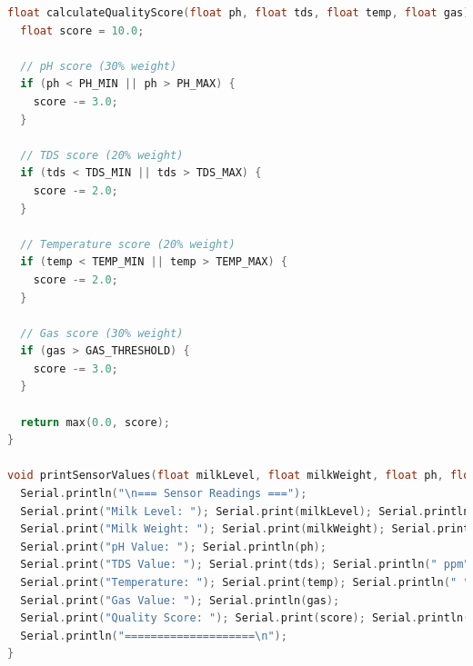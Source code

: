\documentclass[12pt,a4paper]{article}
\begin{document}
\begin{lstlisting}[language=C++, basicstyle=\ttfamily\small, breaklines=true, frame=single, caption={Full Arduino Code for Milk Monitoring System}]
float calculateQualityScore(float ph, float tds, float temp, float gas) {
  float score = 10.0;
  
  // pH score (30% weight)
  if (ph < PH_MIN || ph > PH_MAX) {
    score -= 3.0;
  }
  
  // TDS score (20% weight)
  if (tds < TDS_MIN || tds > TDS_MAX) {
    score -= 2.0;
  }
  
  // Temperature score (20% weight)
  if (temp < TEMP_MIN || temp > TEMP_MAX) {
    score -= 2.0;
  }
  
  // Gas score (30% weight)
  if (gas > GAS_THRESHOLD) {
    score -= 3.0;
  }
  
  return max(0.0, score);
}

void printSensorValues(float milkLevel, float milkWeight, float ph, float tds, float temp, float gas, float score) {
  Serial.println("\n=== Sensor Readings ===");
  Serial.print("Milk Level: "); Serial.print(milkLevel); Serial.println(" cm");
  Serial.print("Milk Weight: "); Serial.print(milkWeight); Serial.println(" g");
  Serial.print("pH Value: "); Serial.println(ph);
  Serial.print("TDS Value: "); Serial.print(tds); Serial.println(" ppm");
  Serial.print("Temperature: "); Serial.print(temp); Serial.println(" °C");
  Serial.print("Gas Value: "); Serial.println(gas);
  Serial.print("Quality Score: "); Serial.print(score); Serial.println("/10");
  Serial.println("====================\n");
}
\end{lstlisting}
\end{document}
